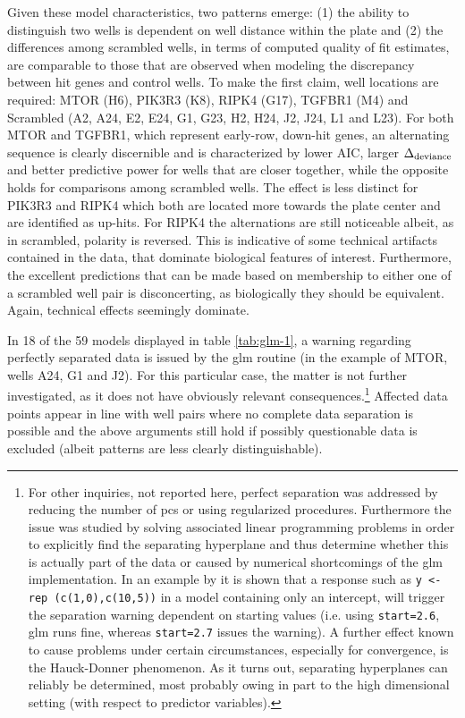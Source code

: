 Given these model characteristics, two patterns emerge: (1) the ability to distinguish two wells is dependent on well distance within the plate and (2) the differences among scrambled wells, in terms of computed quality of fit estimates, are comparable to those that are observed when modeling the discrepancy between hit genes and control wells. To make the first claim, well locations are required: MTOR (H6), PIK3R3 (K8), RIPK4 (G17), TGFBR1 (M4) and Scrambled (A2, A24, E2, E24, G1, G23, H2, H24, J2, J24, L1 and L23). For both MTOR and TGFBR1, which represent early-row, down-hit genes, an alternating sequence is clearly discernible and is characterized by lower AIC, larger $\Delta\textsubscript{deviance}$ and better predictive power for wells that are closer together, while the opposite holds for comparisons among scrambled wells. The effect is less distinct for PIK3R3 and RIPK4 which both are located more towards the plate center and are identified as up-hits. For RIPK4 the alternations are still noticeable albeit, as in scrambled, polarity is reversed. This is indicative of some technical artifacts contained in the data, that dominate biological features of interest. Furthermore, the excellent predictions that can be made based on membership to either one of a scrambled well pair is disconcerting, as biologically they should be equivalent. Again, technical effects seemingly dominate.

In 18 of the 59 models displayed in table \ref{tab:glm-1}, a warning regarding perfectly separated data is issued by the glm routine (in the example of MTOR, wells A24, G1 and J2). For this particular case, the matter is not further investigated, as it does not have obviously relevant consequences.\footnote{For other inquiries, not reported here, perfect separation was addressed by reducing the number of \glspl{pc} or using regularized procedures. Furthermore the issue was studied by solving associated linear programming problems in order to explicitly find the separating hyperplane and thus determine whether this is actually part of the data or caused by numerical shortcomings of the glm implementation. In an example by \citeauthor{Gelman2015} it is shown that a response such as \texttt{y <- rep (c(1,0),c(10,5))} in a model containing only an intercept, will trigger the separation warning dependent on starting values (i.e. using \texttt{start=2.6}, glm runs fine, whereas \texttt{start=2.7} issues the warning). A further effect known to cause problems under certain circumstances, especially for convergence, is the Hauck-Donner phenomenon. As it turns out, separating hyperplanes can reliably be determined, most probably owing in part to the high dimensional setting (with respect to predictor variables).} Affected data points appear in line with well pairs where no complete data separation is possible and the above arguments still hold if possibly questionable data is excluded (albeit patterns are less clearly distinguishable).

